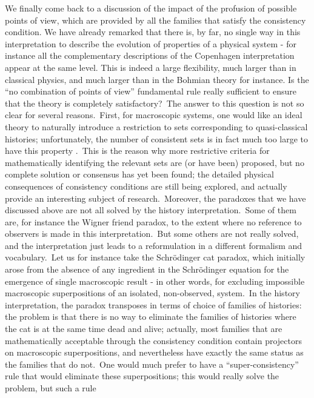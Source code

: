 \documentclass[12pt,onecolumn]{article}%
\begin{document}
We finally come back to a discussion of the impact of the profusion of
possible points of view, which are provided by all the families that satisfy
the consistency condition. We have already remarked that there is, by far, no
single way in this interpretation to describe the evolution of properties of a
physical system - for instance all the complementary descriptions of the
Copenhagen interpretation appear at the same level. This is indeed a large
flexibility, much larger than in classical physics, and much larger than in
the Bohmian theory for instance. Is the ``no combination of points of view''
fundamental rule really sufficient to ensure that the theory is completely
satisfactory?\ The answer to this question is not so clear for several
reasons.\ First, for macroscopic systems, one would like an ideal theory to
naturally introduce a restriction to sets corresponding to quasi-classical
histories; unfortunately, the number of consistent sets is in fact much too
large to have this property \cite{Zurek}.\ This is the reason why more
restrictive criteria for mathematically identifying the relevant sets are (or
have been) proposed, but no complete solution or consensus has yet been found;
the detailed physical consequences of consistency conditions are still being
explored, and actually provide an interesting subject of research.\ Moreover,
the paradoxes that we have discussed above are not all solved by the history
interpretation.\ Some of them are, for instance the Wigner friend paradox, to
the extent where no reference to observers is made in this
interpretation.\ But some others are not really solved, and the interpretation
just leads to a reformulation in a different formalism and vocabulary.\ Let us
for instance take the Schr\"{o}dinger cat paradox, which initially arose from
the absence of any ingredient in the Schr\"{o}dinger equation for the
emergence of single macroscopic result - in other words, for excluding
impossible macroscopic superpositions of an isolated, non-observed,
system.\ In the history interpretation, the paradox transposes in terms of
choice of families of histories: the problem is that there is no way to
eliminate the families of histories where the cat is at the same time dead and
alive; actually, most families that are mathematically acceptable through the
consistency condition contain projectors on macroscopic superpositions, and
nevertheless have exactly the same status as the families that do not.\ One
would much prefer to have a ``super-consistency'' rule that would eliminate
these superpositions; this would really solve the problem, but such a rule
\end{document}
